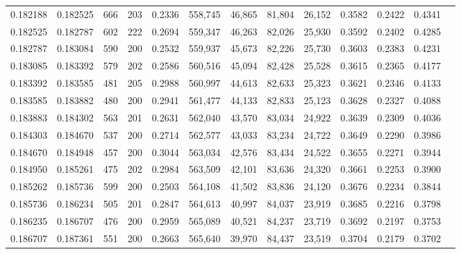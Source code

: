 \begin{tabular}{rrrrrrrrrrrrr}
0.182188 & 0.182525 &   666 & 203 &                                     0.2336 & 558,745 &  46,865 &  81,804 &  26,152 & 0.3582 & 0.2422 & 0.4341 \\
0.182525 & 0.182787 &   602 & 222 &                                     0.2694 & 559,347 &  46,263 &  82,026 &  25,930 & 0.3592 & 0.2402 & 0.4285 \\
0.182787 & 0.183084 &   590 & 200 &                                     0.2532 & 559,937 &  45,673 &  82,226 &  25,730 & 0.3603 & 0.2383 & 0.4231 \\
0.183085 & 0.183392 &   579 & 202 &                                     0.2586 & 560,516 &  45,094 &  82,428 &  25,528 & 0.3615 & 0.2365 & 0.4177 \\
0.183392 & 0.183585 &   481 & 205 &                                     0.2988 & 560,997 &  44,613 &  82,633 &  25,323 & 0.3621 & 0.2346 & 0.4133 \\
0.183585 & 0.183882 &   480 & 200 &                                     0.2941 & 561,477 &  44,133 &  82,833 &  25,123 & 0.3628 & 0.2327 & 0.4088 \\
0.183883 & 0.184302 &   563 & 201 &                                     0.2631 & 562,040 &  43,570 &  83,034 &  24,922 & 0.3639 & 0.2309 & 0.4036 \\
0.184303 & 0.184670 &   537 & 200 &                                     0.2714 & 562,577 &  43,033 &  83,234 &  24,722 & 0.3649 & 0.2290 & 0.3986 \\
0.184670 & 0.184948 &   457 & 200 &                                     0.3044 & 563,034 &  42,576 &  83,434 &  24,522 & 0.3655 & 0.2271 & 0.3944 \\
0.184950 & 0.185261 &   475 & 202 &                                     0.2984 & 563,509 &  42,101 &  83,636 &  24,320 & 0.3661 & 0.2253 & 0.3900 \\
0.185262 & 0.185736 &   599 & 200 &                                     0.2503 & 564,108 &  41,502 &  83,836 &  24,120 & 0.3676 & 0.2234 & 0.3844 \\
0.185736 & 0.186234 &   505 & 201 &                                     0.2847 & 564,613 &  40,997 &  84,037 &  23,919 & 0.3685 & 0.2216 & 0.3798 \\
0.186235 & 0.186707 &   476 & 200 &                                     0.2959 & 565,089 &  40,521 &  84,237 &  23,719 & 0.3692 & 0.2197 & 0.3753 \\
0.186707 & 0.187361 &   551 & 200 &                                     0.2663 & 565,640 &  39,970 &  84,437 &  23,519 & 0.3704 & 0.2179 & 0.3702 \\

\end{tabular}
